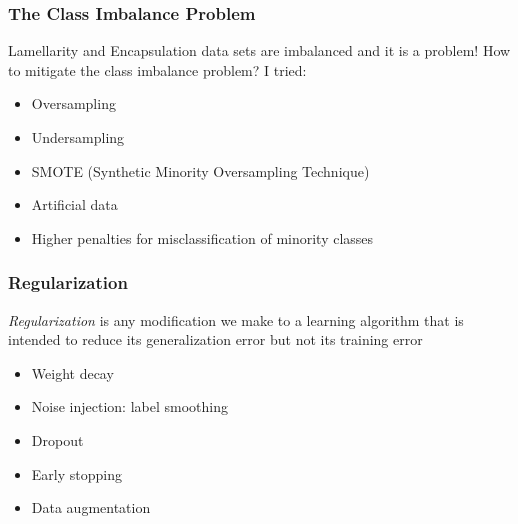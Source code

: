 \documentclass{beamer}
\begin{document}
%
%

\begin{frame}
\frametitle{The Class Imbalance Problem}

Lamellarity and Encapsulation data sets are imbalanced and it is a problem!
\vskip 0.2in
How to mitigate the class imbalance problem? I tried:
\begin{itemize}
\item Oversampling
\item Undersampling
\item SMOTE (Synthetic Minority Oversampling Technique)
\item Artificial data
\item Higher penalties for misclassification of minority classes
\end{itemize}


\end{frame}

%
%

\begin{frame}
\frametitle{Regularization}

\begin{definition}
\textit{Regularization} is any modification we make to a learning algorithm that is intended to reduce its generalization error but not its training error
\end{definition}

\begin{itemize}
\item Weight decay
\item Noise injection: label smoothing
\item Dropout
\item Early stopping
\item Data augmentation
\end{itemize}

\end{frame}

%
%
\end{document}
